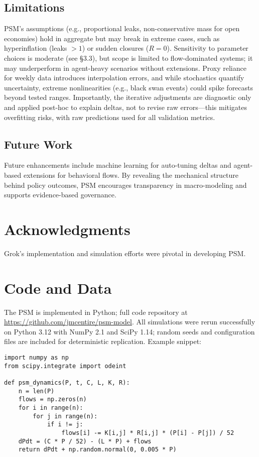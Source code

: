 \documentclass[11pt]{article}
\begin{document}
\subsection{Limitations}
PSM's assumptions (e.g., proportional leaks, non-conservative mass for open economies) hold in aggregate but may break in extreme cases, such as hyperinflation (leaks $>1$) or sudden closures ($R=0$). Sensitivity to parameter choices is moderate (see \S3.3), but scope is limited to flow-dominated systems; it may underperform in agent-heavy scenarios without extensions. Proxy reliance for weekly data introduces interpolation errors, and while stochastics quantify uncertainty, extreme nonlinearities (e.g., black swan events) could spike forecasts beyond tested ranges. Importantly, the iterative adjustments are diagnostic only and applied post-hoc to explain deltas, not to revise raw errors---this mitigates overfitting risks, with raw predictions used for all validation metrics.

\subsection{Future Work}
Future enhancements include machine learning for auto-tuning deltas and agent-based extensions for behavioral flows. By revealing the mechanical structure behind policy outcomes, PSM encourages transparency in macro-modeling and supports evidence-based governance.

\section*{Acknowledgments}
Grok's implementation and simulation efforts were pivotal in developing PSM.



\appendix

\section{Code and Data}
The PSM is implemented in Python; full code repository at \url{https://github.com/jmcentire/psm-model}. All simulations were rerun successfully on Python 3.12 with NumPy 2.1 and SciPy 1.14; random seeds and configuration files are included for deterministic replication. Example snippet:

\begin{verbatim}
import numpy as np
from scipy.integrate import odeint

def psm_dynamics(P, t, C, L, K, R):
    n = len(P)
    flows = np.zeros(n)
    for i in range(n):
        for j in range(n):
            if i != j:
                flows[i] -= K[i,j] * R[i,j] * (P[i] - P[j]) / 52
    dPdt = (C * P / 52) - (L * P) + flows
    return dPdt + np.random.normal(0, 0.005 * P)
\end{verbatim}
\end{document}
